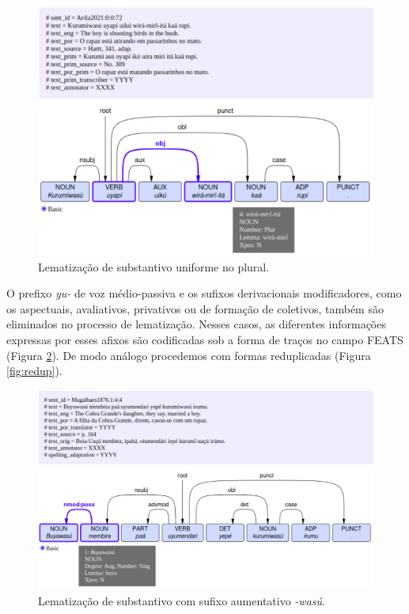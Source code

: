 \documentclass[portuguese]{textolivre}
\begin{document}
\begin{figure}[htbp]
  \centering
  \begin{minipage}{.75\textwidth}
    \includegraphics[width=\linewidth]{figures/wira-miri-avila.pdf}
    \caption{Lematização de substantivo uniforme no plural.}
    \label{fig:wira-miri-avila}
  \end{minipage}
\end{figure}

O prefixo \textit{yu-} de voz médio-passiva e os sufixos derivacionais modificadores, como os aspectuais, avaliativos, privativos ou de formação de coletivos, também são eliminados no processo de lematização. Nesses casos, as diferentes informações expressas por esses afixos são codificadas sob a forma de traços no campo FEATS (Figura \ref{fig:buyawasu}). De modo análogo procedemos com formas reduplicadas (Figura \ref{fig:redup}). 

\begin{figure}[htbp]
  \centering
  \begin{minipage}{.75\textwidth}
    \includegraphics[width=\linewidth]{figures/buyawasu.pdf}
    \caption{Lematização de substantivo com sufixo aumentativo \textit{-wasú}.}
    \label{fig:buyawasu}
  \end{minipage}
\end{figure}
\end{document}
